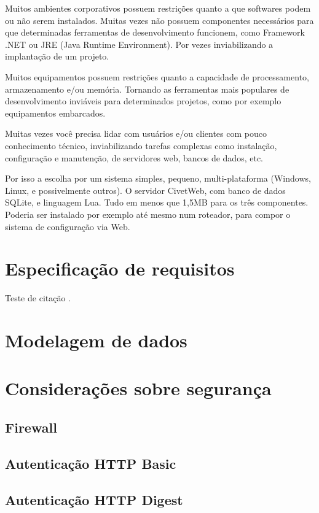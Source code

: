 Muitos ambientes corporativos possuem restrições quanto a que softwares podem ou não serem instalados. Muitas vezes não possuem componentes necessários para que determinadas ferramentas de desenvolvimento funcionem, como Framework .NET ou JRE (Java Runtime Environment). Por vezes inviabilizando a implantação de um projeto.

Muitos equipamentos possuem restrições quanto a capacidade de processamento, armazenamento e/ou memória. Tornando as ferramentas mais populares de desenvolvimento inviáveis para determinados projetos, como por exemplo equipamentos embarcados.

Muitas vezes você precisa lidar com usuários e/ou clientes com pouco conhecimento técnico, inviabilizando tarefas complexas como instalação, configuração e manutenção, de servidores web, bancos de dados, etc.

Por isso a escolha por um sistema simples, pequeno, multi-plataforma (Windows, Linux, e possivelmente outros). O servidor CivetWeb, com banco de dados SQLite, e linguagem Lua. Tudo em menos que 1,5MB para os três componentes. Poderia ser instalado por exemplo até mesmo num roteador, para compor o sistema de configuração via Web.

\chapter{Especificação de requisitos}

Teste de citação \cite{cnet-google-crowdsourcing}.

\chapter{Modelagem de dados}

\chapter{Considerações sobre segurança}

\section{Firewall}

\section{Autenticação HTTP Basic}

\section{Autenticação HTTP Digest}

